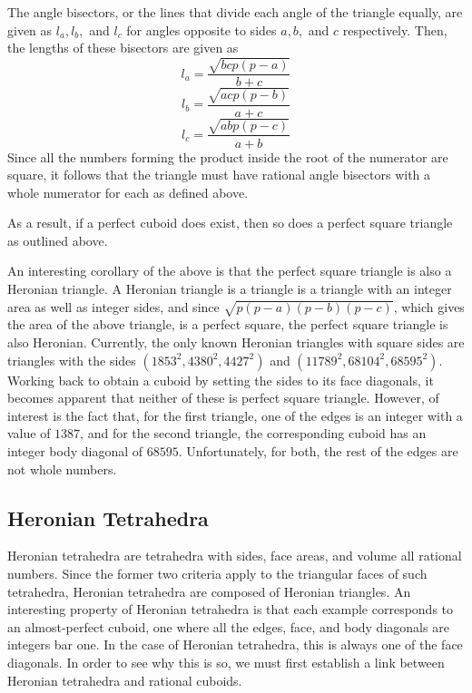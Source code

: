 \documentclass[11pt]{article}
\begin{document}
The angle bisectors, or the lines that divide each angle of the triangle equally, are given as $l_a, l_b,$ and $l_c$ for angles opposite to sides $a, b,$ and $c$ respectively. Then, the lengths of these bisectors are given as
$$l_a=\frac{\sqrt{bcp(p-a)}}{b+c}$$
$$l_b=\frac{\sqrt{acp(p-b)}}{a+c}$$
$$l_c=\frac{\sqrt{abp(p-c)}}{a+b}$$
Since all the numbers forming the product inside the root of the numerator are square, it follows that the triangle must have rational angle bisectors with a whole numerator for each as defined above.

As a result, if a perfect cuboid does exist, then so does a perfect square triangle as outlined above.

An interesting corollary of the above is that the perfect square triangle is also a Heronian triangle. A Heronian triangle is a triangle is a triangle with an integer area as well as integer sides, and since $\sqrt{p(p-a)(p-b)(p-c)}$, which gives the area of the above triangle, is a perfect square, the perfect square triangle is also Heronian. Currently, the only known Heronian triangles with square sides are triangles with the sides $(1853^2, 4380^2, 4427^2)$ and $(11789^2, 68104^2, 68595^2)$.\cite{sqh1}\cite{sqh2} Working back to obtain a cuboid by setting the sides to its face diagonals, it becomes apparent that neither of these is perfect square triangle. However, of interest is the fact that, for the first triangle, one of the edges is an integer with a value of $1387$, and for the second triangle, the corresponding cuboid has an integer body diagonal of $68595$. Unfortunately, for both, the rest of the edges are not whole numbers. 

\subsection{Heronian Tetrahedra}
Heronian tetrahedra are tetrahedra with sides, face areas, and volume all rational numbers. Since the former two criteria apply to the triangular faces of such tetrahedra, Heronian tetrahedra are composed of Heronian triangles. An interesting property of Heronian tetrahedra is that each example corresponds to an almost-perfect cuboid, one where all the edges, face, and body diagonals are integers bar one. In the case of Heronian tetrahedra, this is always one of the face diagonals. In order to see why this is so, we must first establish a link between Heronian tetrahedra and rational cuboids.
\end{document}
